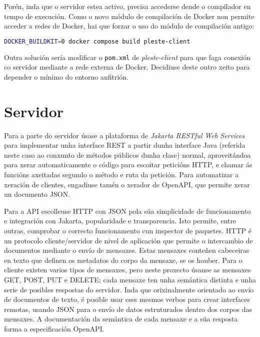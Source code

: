\newpage

Porén, inda que o servidor estea activo, precisa accederse dende o compilador en tempo de execución. Como o novo módulo de compilación de Docker non permite acceder a redes de Docker\cite{dockernetwork}, hai que forzar o uso do módulo de compilación antigo:

\begin{lstlisting}[language=bash]
DOCKER_BUILDKIT=0 docker compose build pleste-client
\end{lstlisting}

Outra solución sería modificar o \texttt{pom.xml} de \textit{pleste-client} para que faga conexión co servidor mediante a rede externa de Docker. Decidiuse deste outro xeito para depender o mínimo do entorno anfitrión.

\section{Servidor}
\label{sec:tec_servidor}

Para a parte do servidor úsase a plataforma de \textit{Jakarta RESTful Web Services} para implementar unha interface REST a partir dunha interface Java (referida neste caso ao conxunto de métodos públicos dunha clase) normal, aproveitándoa para xerar automaticamente o código para escoitar peticións HTTP, e chamar ás funcións axeitadas segundo o método e ruta da petición. Para automatizar a xeración de clientes, engadiuse tamén o xerador de OpenAPI, que permite xerar un documento JSON.

Para a API escolleuse HTTP con JSON pola súa simplicidade de funcionamento e integración con Jakarta, popularidade e transparencia. Isto permite, entre outras, comprobar o correcto funcionamento cun inspector de paquetes. HTTP é un protocolo cliente/servidor de nivel de aplicación que permite o intercambio de documentos  mediante o envío de mensaxes\cite{rfc9112}. Estas mensaxes conteñen cabeceiras en texto que definen os metadatos do corpo da mensaxe, se os houber. Para o cliente existen varios tipos de mensaxes, pero neste proxecto úsanse as mensaxes GET, POST, PUT e DELETE; cada mensaxe ten unha semántica distinta e unha serie de posibles respostas do servidor\cite{rfc7231}. Inda que orixinalmente orientado ao envío de documentos de texto, é posible usar eses mesmos verbos para crear interfaces remotas, usando JSON para o envío de datos estruturados dentro dos corpos das mensaxes.\cite{rest} A documentación da semántica de cada mensaxe e a súa resposta forma a especificación OpenAPI.\cite{jpaquery}

